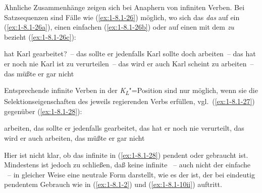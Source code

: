 \documentclass[output=paper]{langsci/langscibook}
\begin{document}
Ähnliche Zusammenhänge zeigen sich bei Anaphern von infiniten Verben. Bei
Satzsequenzen sind Fälle wie (\ref{ex:1-8.1-26}) möglich, wo sich das \textit{das} auf ein  (\ref{ex:1-8.1-26a}), einen einfachen  (\ref{ex:1-8.1-26b}) oder auf einen  mit dem  \textit{zu} bezieht (\ref{ex:1-8.1-26c}):
\begin{exe}
\ex\label{ex:1-8.1-26}
\begin{xlist}
\ex\label{ex:1-8.1-26a} hat Karl gearbeitet?~– das sollte er jedenfalls
\ex\label{ex:1-8.1-26b} Karl sollte doch arbeiten~-- das hat er noch nie
\ex\label{ex:1-8.1-26c} Karl ist zu verurteilen~-- das wird er auch
\ex\label{ex:1-8.1-26d} Karl scheint zu arbeiten~-- das müßte er gar nicht
\end{xlist}
\end{exe}
Entsprechende infinite Verben in der \textit{K\textsubscript{L}}"=Position sind nur möglich, wenn sie die
Selektionseigenschaften des jeweils regierenden Verbs erfüllen, vgl.\ (\ref{ex:1-8.1-27}) gegenüber
(\ref{ex:1-8.1-28}):
\begin{exe}
\ex\label{ex:1-8.1-27}
\begin{xlist}
\end{xlist}
\end{exe}
\begin{exe}
\ex\label{ex:1-8.1-28}
\begin{xlist}
\ex\label{ex:1-8.1-28a}  arbeiten, das sollte er jedenfalls
\ex\label{ex:1-8.1-28b} gearbeitet, das hat er noch nie
\ex\label{ex:1-8.1-28c} verurteilt, das wird er auch
\ex\label{ex:1-8.1-28d} arbeiten, das müßte er gar nicht
\end{xlist}
\end{exe}
Hier ist nicht klar, ob das infinite  in (\ref{ex:1-8.1-28})
pendent oder  gebraucht ist. Mindestens ist jedoch zu
schließen, daß keine infinite ~-- auch nicht der einfache
~-- in gleicher Weise eine neutrale Form darstellt, wie es
der  ist, der bei eindeutig pendentem Gebrauch wie in
(\ref{ex:1-8.1-2}) und (\ref{ex:1-8.1-10ii}) auftritt.
\end{document}

